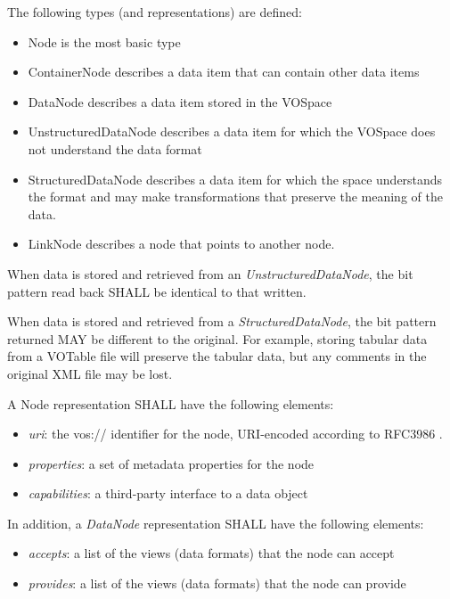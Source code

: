 \documentclass[11pt,a4paper]{ivoa}
\begin{document}
The following types (and representations) are defined:

\begin{itemize}
    \item Node is the most basic type
    \item ContainerNode describes a data item that can contain other data items
    \item DataNode describes a data item stored in the VOSpace
    \item UnstructuredDataNode describes a data item for which the VOSpace does not understand the data format
    \item StructuredDataNode describes a data item for which the space understands the format and may make transformations that preserve the meaning of the data.
    \item LinkNode describes a node that points to another node.
\end{itemize}

When data is stored and retrieved from an \emph{UnstructuredDataNode}, the bit pattern read back SHALL be identical to that written.

When data is stored and retrieved from a \emph{StructuredDataNode}, the bit pattern returned MAY be different to the original. For example, storing tabular data from a VOTable file will preserve the tabular data, but any comments in the original XML file may be lost.

A Node representation SHALL have the following elements:

\begin{itemize}
    \item \emph{uri}: the vos:// identifier for the node, URI-encoded according to RFC3986 \citep{std:RFC3986}.
    \item \emph{properties}: a set of metadata properties for the node
    \item \emph{capabilities}: a third-party interface to a data object
\end{itemize}

In addition, a \emph{DataNode} representation SHALL have the following elements:

\begin{itemize}
    \item \emph{accepts}: a list of the views (data formats) that the node can accept
    \item \emph{provides}: a list of the views (data formats) that the node can provide
\end{itemize}
\end{document}
